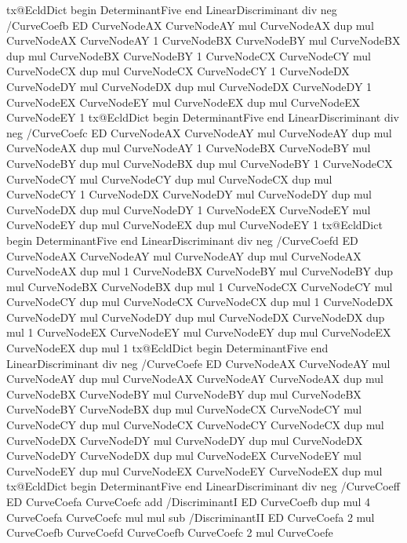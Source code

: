 {{        tx@EcldDict begin DeterminantFive end LinearDiscriminant div neg /CurveCoefb ED
        CurveNodeAX CurveNodeAY mul CurveNodeAX dup mul CurveNodeAX CurveNodeAY 1
        CurveNodeBX CurveNodeBY mul CurveNodeBX dup mul CurveNodeBX CurveNodeBY 1
        CurveNodeCX CurveNodeCY mul CurveNodeCX dup mul CurveNodeCX CurveNodeCY 1
        CurveNodeDX CurveNodeDY mul CurveNodeDX dup mul CurveNodeDX CurveNodeDY 1
        CurveNodeEX CurveNodeEY mul CurveNodeEX dup mul CurveNodeEX CurveNodeEY 1
        tx@EcldDict begin DeterminantFive end LinearDiscriminant div neg /CurveCoefc ED
        CurveNodeAX CurveNodeAY mul CurveNodeAY dup mul CurveNodeAX dup mul CurveNodeAY 1
        CurveNodeBX CurveNodeBY mul CurveNodeBY dup mul CurveNodeBX dup mul CurveNodeBY 1
        CurveNodeCX CurveNodeCY mul CurveNodeCY dup mul CurveNodeCX dup mul CurveNodeCY 1
        CurveNodeDX CurveNodeDY mul CurveNodeDY dup mul CurveNodeDX dup mul CurveNodeDY 1
        CurveNodeEX CurveNodeEY mul CurveNodeEY dup mul CurveNodeEX dup mul CurveNodeEY 1
        tx@EcldDict begin DeterminantFive end LinearDiscriminant div neg /CurveCoefd ED
        CurveNodeAX CurveNodeAY mul CurveNodeAY dup mul CurveNodeAX CurveNodeAX dup mul 1
        CurveNodeBX CurveNodeBY mul CurveNodeBY dup mul CurveNodeBX CurveNodeBX dup mul 1
        CurveNodeCX CurveNodeCY mul CurveNodeCY dup mul CurveNodeCX CurveNodeCX dup mul 1
        CurveNodeDX CurveNodeDY mul CurveNodeDY dup mul CurveNodeDX CurveNodeDX dup mul 1
        CurveNodeEX CurveNodeEY mul CurveNodeEY dup mul CurveNodeEX CurveNodeEX dup mul 1
        tx@EcldDict begin DeterminantFive end LinearDiscriminant div neg /CurveCoefe ED
        CurveNodeAX CurveNodeAY mul CurveNodeAY dup mul CurveNodeAX CurveNodeAY CurveNodeAX dup mul
        CurveNodeBX CurveNodeBY mul CurveNodeBY dup mul CurveNodeBX CurveNodeBY CurveNodeBX dup mul
        CurveNodeCX CurveNodeCY mul CurveNodeCY dup mul CurveNodeCX CurveNodeCY CurveNodeCX dup mul
        CurveNodeDX CurveNodeDY mul CurveNodeDY dup mul CurveNodeDX CurveNodeDY CurveNodeDX dup mul
        CurveNodeEX CurveNodeEY mul CurveNodeEY dup mul CurveNodeEX CurveNodeEY CurveNodeEX dup mul
        tx@EcldDict begin DeterminantFive end LinearDiscriminant div neg /CurveCoeff ED
        CurveCoefa CurveCoefc add /DiscriminantI ED
        CurveCoefb dup mul 4 CurveCoefa CurveCoefc mul mul sub /DiscriminantII ED
        CurveCoefa 2 mul CurveCoefb CurveCoefd
        CurveCoefb CurveCoefc 2 mul CurveCoefe
}}
